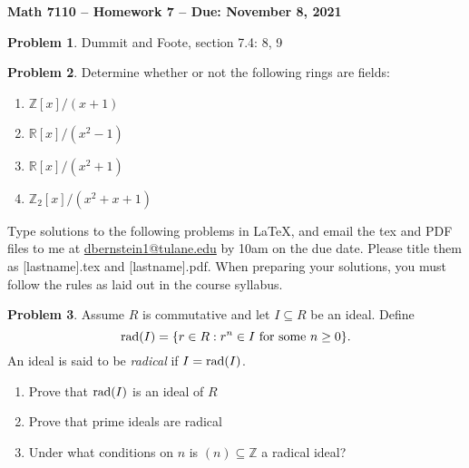 \documentclass[letterpaper,11pt]{amsart}
\theoremstyle{plain}
\theoremstyle{definition}
\newtheorem{pr}{Problem}
\theoremstyle{remark}
\begin{document}
\Large

\begin{center}
{\bf Math 7110 -- Homework  7 --  Due:  November 8, 2021}
\end{center}

\normalsize


\medskip

\begin{pr}
    Dummit and Foote, section 7.4: 8, 9
\end{pr}


\begin{pr}
    Determine whether or not the following rings are fields:
    \begin{enumerate}
        \item $\mathbb{Z}[x]/(x+1)$
        \item $\mathbb{R}[x]/(x^2-1)$
        \item $\mathbb{R}[x]/(x^2+1)$
        \item $\mathbb{Z}_2[x]/(x^2+x+1)$ 
    \end{enumerate}
\end{pr}



\bigskip

Type solutions to the following problems in \LaTeX, and email the tex and PDF files to me at \url{dbernstein1@tulane.edu} by 10am on the due date.
Please title them as [lastname].tex and [lastname].pdf.
When preparing your solutions, you must follow the rules as laid out in the course syllabus.

\vspace{.5cm}


\begin{pr}
    Assume $R$ is commutative and let $I \subseteq R$ be an ideal.
    Define
    \[
        {\rm rad}(I) = \{r \in R : r^n \in I {\rm \ for \ some \ } n \ge 0\}. 
    \]
    An ideal is said to be \emph{radical} if $I = {\rm rad}(I)$.
    \begin{enumerate}
        \item Prove that ${\rm rad}(I)$ is an ideal of $R$
        \item Prove that prime ideals are radical
        \item Under what conditions on $n$ is $(n)\subseteq \mathbb{Z}$ a radical ideal?
    \end{enumerate}
\end{pr}
\end{document}

